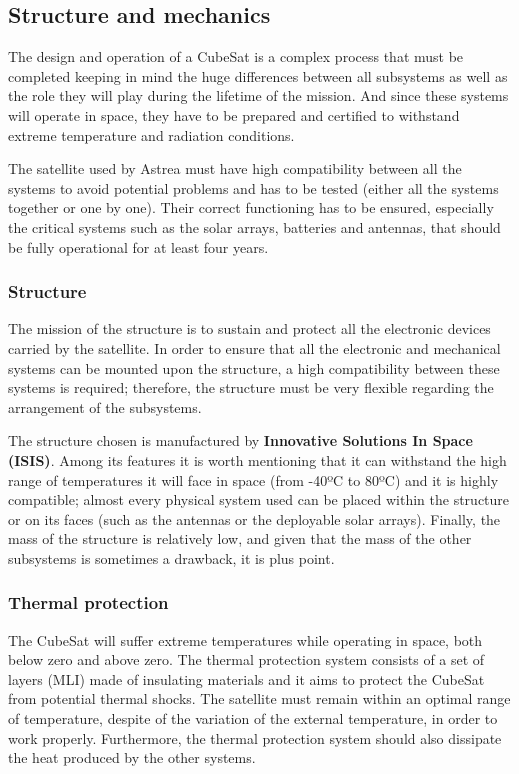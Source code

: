 \subsection{Structure and mechanics}
The design and operation of a CubeSat is a complex process that must be completed keeping in mind the huge differences between all subsystems as well as the role they will play during the lifetime of the mission. And since these systems will operate in space, they have to be prepared and certified to withstand extreme temperature and radiation conditions.

The satellite used by Astrea must have high compatibility between all the systems to avoid potential problems and has to be tested (either all the systems together or one by one). Their correct functioning has to be ensured, especially the critical systems such as the solar arrays, batteries and antennas, that should be fully operational for at least four years.

\subsubsection{Structure}
The mission of the structure is to sustain and protect all the electronic devices carried by the satellite. In order to ensure that all the electronic and mechanical systems can be mounted upon the structure, a high compatibility between these systems is required; therefore, the structure must be very flexible regarding the arrangement of the subsystems.

The structure chosen is manufactured by \textbf{Innovative Solutions In Space (ISIS)}. Among its features it is worth mentioning that it can withstand the high range of temperatures it will face in space (from -40ºC to 80ºC) and it is highly compatible; almost every physical system used can be placed within the structure or on its faces (such as the antennas or the deployable solar arrays). Finally, the mass of the structure is relatively low, and given that the mass of the other subsystems is sometimes a drawback, it is plus point. \cite[Chapter 1, Section 1]{annex4}

\subsubsection{Thermal protection}
The CubeSat will suffer extreme temperatures while operating in space, both below zero and above zero. The thermal protection system consists of a set of layers (MLI) made of insulating materials and it aims to protect the CubeSat from potential thermal shocks. The satellite must remain within an optimal range of temperature, despite of the variation of the external temperature, in order to work properly. Furthermore, the thermal protection system should also dissipate the heat produced by the other systems.

